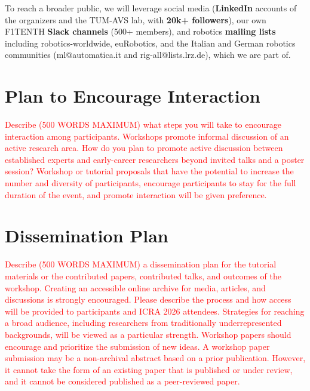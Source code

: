 \documentclass[12pt,a4paper]{article}
\newcommand{\revM}[1]{\textcolor{Red}{#1}}
\begin{document}
To reach a broader public, we will leverage social media (\textbf{LinkedIn} accounts of the organizers and the TUM-AVS lab, with \textbf{20k+ followers}), our own F1TENTH \textbf{Slack channels} (500+ members), and robotics \textbf{mailing lists} including robotics-worldwide, euRobotics, and the Italian and German robotics communities (ml@automatica.it and rig-all@lists.lrz.de), which we are part of. 
%
%
\section{Plan to Encourage Interaction}
%
\revM{Describe (500 WORDS MAXIMUM) what steps you will take to encourage interaction among participants. Workshops promote informal discussion of an active research area. How do you plan to promote active discussion between established experts and early-career researchers beyond invited talks and a poster session? Workshop or tutorial proposals that have the potential to increase the number and diversity of participants, encourage participants to stay for the full duration of the event, and promote interaction will be given preference.}
%
\section{Dissemination Plan}
%
\revM{Describe (500 WORDS MAXIMUM) a dissemination plan for the tutorial materials or the contributed papers, contributed talks, and outcomes of the workshop. Creating an accessible online archive for media, articles, and discussions is strongly encouraged. Please describe the process and how access will be provided to participants and ICRA 2026 attendees. Strategies for reaching a broad audience, including researchers from traditionally underrepresented backgrounds, will be viewed as a particular strength. Workshop papers should encourage and prioritize the submission of new ideas. A workshop paper submission may be a non-archival abstract based on a prior publication. However, it cannot take the form of an existing paper that is published or under review, and it cannot be considered published as a peer-reviewed paper.}
%
\end{document}

